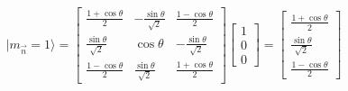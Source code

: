 \documentclass[letter]{article}
\begin{document}
\[
	| m_ {\vec{n}}    = 1\rangle = 
\begin{bmatrix} 
	\frac{1 + \cos \theta}{2} & 
	- \frac{\sin \theta}{\sqrt{2} } & 
	\frac{1 - \cos \theta}{2} \\ 
	\frac{\sin \theta}{\sqrt{2}  } & 
	\cos \theta & 
	- \frac{\sin \theta}{\sqrt{2} } \\ 
	\frac{1 - \cos \theta }{2} & 
	\frac{\sin \theta}{\sqrt{2} } & 
\frac{1 + \cos \theta }{2} 
\end{bmatrix}  
\begin{bmatrix} 1 \\ 0 \\ 0 \end{bmatrix}  = \begin{bmatrix} \frac{1+\cos \theta}{2} \\ 
\frac{\sin \theta}{\sqrt{2} } \\ 
\frac{1 - \cos \theta }{2}\end{bmatrix} 
\]
\end{document}
